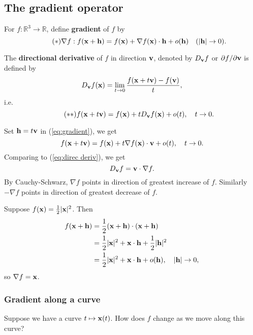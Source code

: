 \subsection{The gradient operator}
\begin{definition}[Gradient]
    For $ f: \mathbb{R}^{3}\to \mathbb{R} $, define \textbf{gradient} of $f$ by 
    \begin{equation}\label{eq:gradient}\tag{$ * $}
        \nabla f : f({\bf x}+{\bf h}) = f({\bf x})+ \nabla f({\bf x}) \cdot {\bf h}+o({\bf h})\quad (|{\bf h}|\to 0).
    \end{equation}
\end{definition}
\begin{definition}
    The \textbf{directional derivative} of $f$ in direction ${\bf v}$, denoted by $ D_{\bf v} f $ or $ \partial f/\partial {\bf v}  $ is defined by 
    \[
        D_{\bf v} f({\bf x}) = \lim_{t \to 0} \frac{f({\bf x}+t{\bf v})-f({\bf v})}{t}, 
    \]
    i.e.
    \begin{equation}\label{eq:direc deriv}\tag{$ ** $}
        f({\bf x}+t{\bf v})=f({\bf x})+t D_{\bf v} f({\bf x})+o(t),\quad t\to 0. 
    \end{equation}
\end{definition}

Set $ {\bf h}=t{\bf v} $ in (\ref{eq:gradient}), we get 
\[
    f({\bf x}+t{\bf v}) = f({\bf x})+t \nabla f({\bf x}) \cdot {\bf v} + o(t),\quad t\to 0.
\]
Comparing to (\ref{eq:direc deriv}), we get 
\[
    D_{\bf v} f = {\bf v} \cdot \nabla f.
\]
By Cauchy-Schwarz, $ \nabla f $ points in direction of greatest increase of $f$. Similarly $ - \nabla f $ points in direction of greatest decrease of $f$.

\begin{example}
    Suppose $ f({\bf x}) = \frac{1}{2}|{\bf x}|^2 $. Then 
    \begin{align*}
        f({\bf x}+{\bf h}) &= \frac{1}{2}({\bf x}+{\bf h})\cdot ({\bf x}+{\bf h})\\ 
        &= \frac{1}{2}|{\bf x}|^2+ {\bf x} \cdot {\bf h}+\frac{1}{2}|{\bf h}|^2\\ 
        &= \frac{1}{2}|{\bf x}|^2+{\bf x} \cdot {\bf h}+o({\bf h}),\quad |{\bf h}|\to 0,
    \end{align*}
    so $ \nabla f ={\bf x} $.
\end{example}

\subsubsection*{Gradient along a curve}
Suppose we have a curve $ t \mapsto {\bf x}(t) $. How does $f$ change as we move along this curve?

